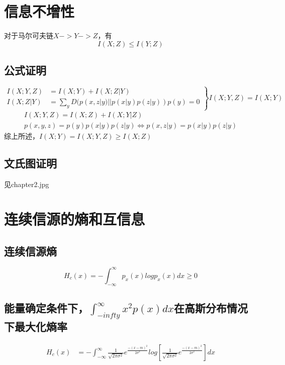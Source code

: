 \documentclass[a4paper, 12pt]{article}
\begin{document}
    \section{信息不增性}
    对于马尔可夫链$X -> Y -> Z$，有
    \[I(X;Z)\le I(Y;Z)\]
    \subsection{公式证明}
    \begin{equation}
        \left.\begin{aligned}
            I(X;Y,Z)&=I(X;Y)+I(X;Z|Y)\\
            I(X;Z|Y)&=\sum_yD(p(x,z|y)||p(x|y)p(z|y))p(y)=0
        \end{aligned}
        \right\}
        I(X;Y,Z)=I(X;Y)
    \end{equation}
    \begin{equation}
        \begin{aligned}
            I(X;Y,Z)=I(X;Z)+I(X;Y|Z)\\
            p(x,y,z)=p(y)p(x|y)p(z|y)\iff p(x,z|y)=p(x|y)p(z|y)
        \end{aligned}
    \end{equation}
    综上所述，$I(X;Y)=I(X;Y,Z)\ge I(X;Z)$
    \subsection{文氏图证明}
    见chapter2.jpg
    \section{连续信源的熵和互信息}
    \subsection{连续信源熵}
    \[H_c(x)=-\int_{-\infty}^{\infty}p_x(x)logp_x(x)dx\ge 0\]
    \subsection{能量确定条件下，$\int_{-infty}^{\infty}x^2p(x)dx$在高斯分布情况下最大化熵率}
    \begin{equation}
        \begin{aligned}
            H_c(x)&=-\int_{-\infty}^{\infty}\frac{1}{\sqrt{2\pi\sigma^2}}e^{\frac{-(x-m)^2}{2\sigma^2}}log[\frac{1}{\sqrt{2\pi\sigma^2}}e^{\frac{-(x-m)^2}{2\sigma^2}}]dx
        \end{aligned}
    \end{equation}
\end{document}
